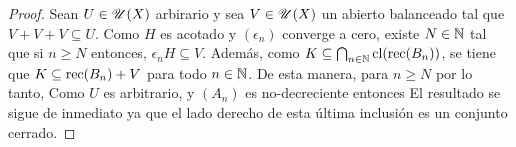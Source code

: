 \begin{proof}
Sean $U\in\mathscr{U}(X)$ arbirario y sea $V\in\mathscr{U}(X)$ un abierto
balanceado tal que $V+V+V\subseteq U$. Como $H$ es acotado
y $(\epsilon_n)$ converge a cero, existe $N\in\mathbb{N}$
tal que si $n\geq N$ entonces, $\epsilon_nH\subseteq V$.
Además, como $K\subseteq\bigcap_{n\in\mathbb{N}}\mathop{\hbox{\rm cl}}\nolimits(\mathop{\hbox{\rm rec}}\nolimits(B_n))$,
se tiene que $K\subseteq\mathop{\hbox{\rm rec}}\nolimits(B_n) + V$ para todo $n\in\mathbb{N}$.
De esta manera, para $n\geq N$
por lo tanto,
Como $U$ es arbitrario, y $(A_n)$ es no-decreciente
entonces
El resultado se sigue de inmediato ya que el lado derecho de esta 
última inclusión es un conjunto cerrado.
\end{proof}
